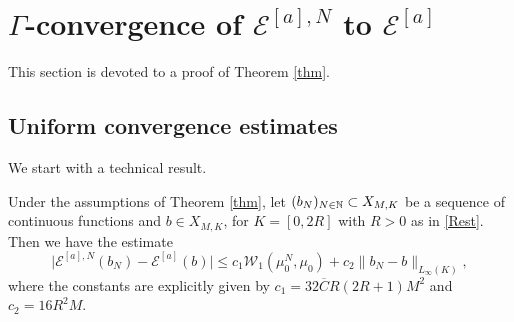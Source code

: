 

\section{$\Gamma$-convergence of $ \mathcal E^{[a],N} $ to $ \mathcal E^{[a]} $}




This section is devoted to a proof of Theorem \ref{thm}.

\subsection{Uniform convergence estimates}

We start with a technical result.

\begin{lemma}\label{lemma-semicontinuous-0}
	Under the assumptions of Theorem \ref{thm}, let $(b_N)_{N \in \mathbb{N}}\subset X_{M,K}$ be a sequence of continuous functions and $b \in X_{M,K}$, for $K=[0,2R]$  with $R>0$ as in \eqref{Rest}.
	Then we have the estimate
\begin{equation}\label{approxestimate}	
\bigl|\mathcal E^{[a],N}(b_N)-\mathcal E^{[a]}(b)\bigr|
		\leq  c_1 \mathcal{W}_1(\mu_0^N,\mu_0)+ c_2 \| b_{N}-b\|_{L_\infty(K)},
\end{equation}
where the constants are explicitly given by $c_1= 32 \overline{C}R(2R+1)M^2$ and $c_2 = 16R^2M$.
\end{lemma}

